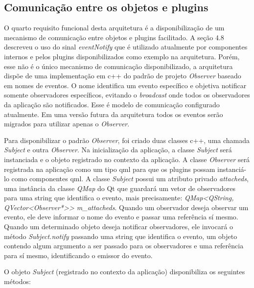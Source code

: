 \subsection{Comunicação entre os objetos e plugins}
O quarto requisito funcional desta arquitetura é a disponibilização de um mecanismo de comunicação entre objetos e plugins facilitado. A seção 4.8 descreveu o uso do sinal \textit{eventNotify} que é utilizado atualmente por componentes internos e pelos plugins disponibilizados como exemplo na arquitetura. Porém, esse não é o único mecanismo de comunicação disponibilizado, a arquitetura dispõe de uma implementação em c++ do padrão de projeto \textit{Observer} baseado em nomes de eventos. O nome identifica um evento específico e objetiva notificar somente observadores específicos, evitando o \textit{broadcast} onde todos os observadores da aplicação são notificados. Esse é modelo de comunicação configurado atualmente. Em uma versão futura da arquitetura todos os eventos serão migrados para utilizar apenas o \textit{Observer}.\par

Para disponibilizar o padrão \textit{Observer}, foi criado duas classes c++, uma chamada \textit{Subject} e outra \textit{Observer}. Na inicialização da aplicação, a classe \textit{Subject} será instanciada e o objeto registrado no contexto da aplicação. A classe \textit{Observer} será registrada na aplicação como um tipo qml para que os plugins possam instanciá-lo como componentes qml. A classe \textit{Subject} possui um atributo privado \textit{attacheds}, uma instância da classe \textit{QMap} do Qt que guardará um vetor de observadores para uma string que identifica o evento, mais precisamente: \textit{QMap<QString, QVector<Observer*>> m\_attacheds}. Quando um observador deseja observar um evento, ele deve informar o nome do evento e passar uma referência sí mesmo. Quando um determinado objeto deseja notificar observadores, ele invocará o método \textit{Subject.notify} passando uma string que identifica o evento, um objeto contendo algum argumento a ser passado para os observadores e uma referência para sí mesmo, identificando o emissor do evento.

O objeto \textit{Subject} (registrado no contexto da aplicação) disponibiliza os seguintes métodos:

